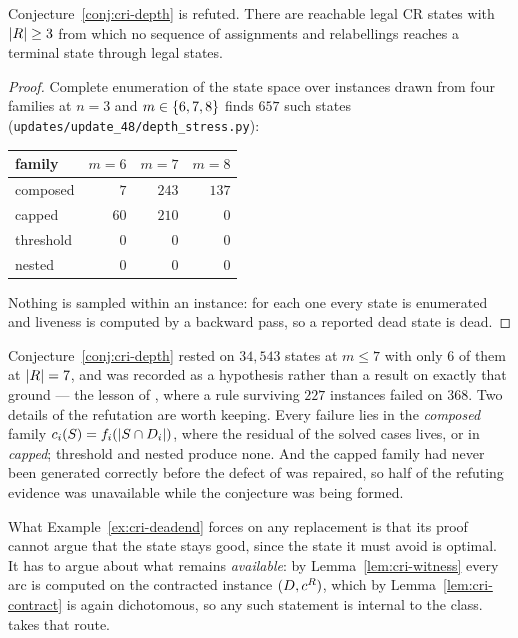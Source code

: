 \begin{proposition}
\label{prop:cri-depth-false}
Conjecture~\ref{conj:cri-depth} is refuted. There are reachable legal CR states
with $\left\lvert R\right\rvert \ge 3$ from which no sequence of assignments and relabellings
reaches a terminal state through legal states.
\end{proposition}

\begin{proof}
Complete enumeration of the state space over instances drawn from four families
at $n = 3$ and $m \in \left\{6,7,8\right\}$ finds $657$ such states
(\texttt{updates/update\_48/depth\_stress.py}):
\begin{center}\small
\begin{tabular}{@{}lrrr@{}}
\toprule
family & $m = 6$ & $m = 7$ & $m = 8$ \\
\midrule
composed  & $7$  & $243$ & $137$ \\
capped    & $60$ & $210$ & $0$ \\
threshold & $0$  & $0$   & $0$ \\
nested    & $0$  & $0$   & $0$ \\
\bottomrule
\end{tabular}
\end{center}
Nothing is sampled within an instance: for each one every state is enumerated and
liveness is computed by a backward pass, so a reported dead state is dead.
\end{proof}

\begin{remark}
\label{rem:cri-caveat}
Conjecture~\ref{conj:cri-depth} rested on $34{,}543$ states at $m \le 7$ with only
$6$ of them at $\left\lvert R\right\rvert = 7$, and was recorded as a hypothesis rather than a
result on exactly that ground --- the lesson of , where a
rule surviving $227$ instances failed on $368$. Two details of the refutation are
worth keeping. Every failure lies in the \emph{composed} family
$c_i(S) = f_i(\left\lvert S \cap D_i\right\rvert)$, where the residual of the solved cases
lives, or in \emph{capped}; threshold and nested produce none. And the capped
family had never been generated correctly before the defect of
 was repaired, so half of the refuting evidence was
unavailable while the conjecture was being formed.
\end{remark}

What Example~\ref{ex:cri-deadend} forces on any replacement is that its proof
cannot argue that the state stays good, since the state it must avoid is
optimal. It has to argue about what remains \emph{available}: by
Lemma~\ref{lem:cri-witness} every arc is computed on the contracted instance
$(D, c^{R})$, which by Lemma~\ref{lem:cri-contract} is again dichotomous, so
any such statement is internal to the class.  takes that
route.

